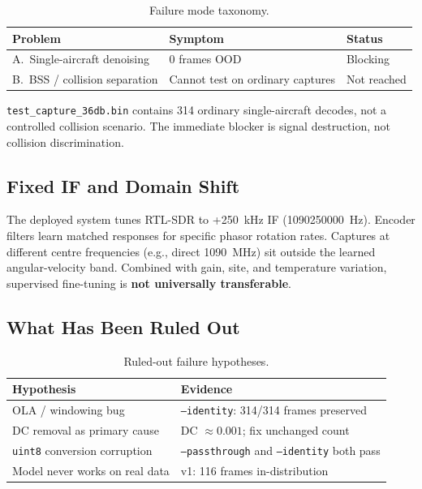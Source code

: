 \documentclass[11pt,a4paper]{article}
\begin{document}
\begin{table}[htbp]
  \centering
  \caption{Failure mode taxonomy.}
  \label{tab:failure-modes}
  \begin{tabular}{@{}lll@{}}
    \toprule
    Problem & Symptom & Status \\
    \midrule
    A.\ Single-aircraft denoising & 0 frames OOD & Blocking \\
    B.\ BSS / collision separation & Cannot test on ordinary captures &
    Not reached \\
    \bottomrule
  \end{tabular}
\end{table}

\texttt{test\_capture\_36db.bin} contains 314 ordinary single-aircraft
decodes, not a controlled collision scenario. The immediate blocker is signal
destruction, not collision discrimination.

\subsection{Fixed IF and Domain Shift}

The deployed system tunes RTL-SDR to +250~kHz IF (1090250000~Hz). Encoder
filters learn matched responses for specific phasor rotation rates. Captures at
different centre frequencies (e.g., direct 1090~MHz) sit outside the learned
angular-velocity band. Combined with gain, site, and temperature variation,
supervised fine-tuning is \textbf{not universally transferable}.

\subsection{What Has Been Ruled Out}

\begin{table}[htbp]
  \centering
  \caption{Ruled-out failure hypotheses.}
  \label{tab:ruled-out}
  \begin{tabular}{@{}ll@{}}
    \toprule
    Hypothesis & Evidence \\
    \midrule
    OLA / windowing bug & \texttt{--identity}: 314/314 frames preserved \\
    DC removal as primary cause & DC $\approx 0.001$; fix unchanged count \\
    \texttt{uint8} conversion corruption & \texttt{--passthrough} and
    \texttt{--identity} both pass \\
    Model never works on real data & v1: 116 frames in-distribution \\
    \bottomrule
  \end{tabular}
\end{table}
\end{document}

